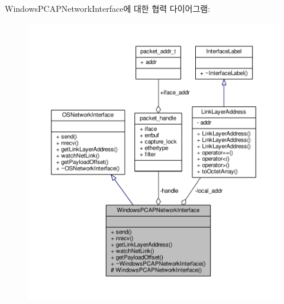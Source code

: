 Windows\+P\+C\+A\+P\+Network\+Interface에 대한 협력 다이어그램\+:
\nopagebreak
\begin{figure}[H]
\begin{center}
\leavevmode
\includegraphics[width=350pt]{class_windows_p_c_a_p_network_interface__coll__graph}
\end{center}
\end{figure}
